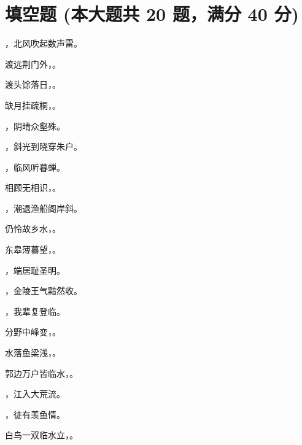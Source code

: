 \documentclass[12pt, a4paper, addpoints]{exam}
\begin{document}
\pagestyle{headandfoot}

\begin{center}
\end{center}
\vspace{5mm}

\normalsize
\vspace{5mm}

\section{\normalsize{填空题 (本大题共 20 题，满分 40 分)}}
\hspace{1.5cm}
\begin{questions}
\question[2] \uline{\qquad\qquad\qquad\qquad}，北风吹起数声雷。

\question[2] 渡远荆门外，\uline{\qquad\qquad\qquad\qquad}。

\question[2] 渡头馀落日，\uline{\qquad\qquad\qquad\qquad}。

\question[2] 缺月挂疏桐，\uline{\qquad\qquad\qquad\qquad}。

\question[2] \uline{\qquad\qquad\qquad\qquad}，阴晴众壑殊。

\question[2] \uline{\qquad\qquad\qquad\qquad}，斜光到晓穿朱户。

\question[2] \uline{\qquad\qquad\qquad\qquad}，临风听暮蝉。

\question[2] 相顾无相识，\uline{\qquad\qquad\qquad\qquad}。

\question[2] \uline{\qquad\qquad\qquad\qquad}，潮退渔船阁岸斜。

\question[2] 仍怜故乡水，\uline{\qquad\qquad\qquad\qquad}。

\question[2] 东皋薄暮望，\uline{\qquad\qquad\qquad\qquad}。

\question[2] \uline{\qquad\qquad\qquad\qquad}，端居耻圣明。

\question[2] \uline{\qquad\qquad\qquad\qquad}，金陵王气黯然收。

\question[2] \uline{\qquad\qquad\qquad\qquad}，我辈复登临。

\question[2] 分野中峰变，\uline{\qquad\qquad\qquad\qquad}。

\question[2] 水落鱼梁浅，\uline{\qquad\qquad\qquad\qquad}。

\question[2] 郭边万户皆临水，\uline{\qquad\qquad\qquad\qquad}。

\question[2] \uline{\qquad\qquad\qquad\qquad}，江入大荒流。

\question[2] \uline{\qquad\qquad\qquad\qquad}，徒有羡鱼情。

\question[2] 白鸟一双临水立，\uline{\qquad\qquad\qquad\qquad}。

\end{questions}
\end{document}
